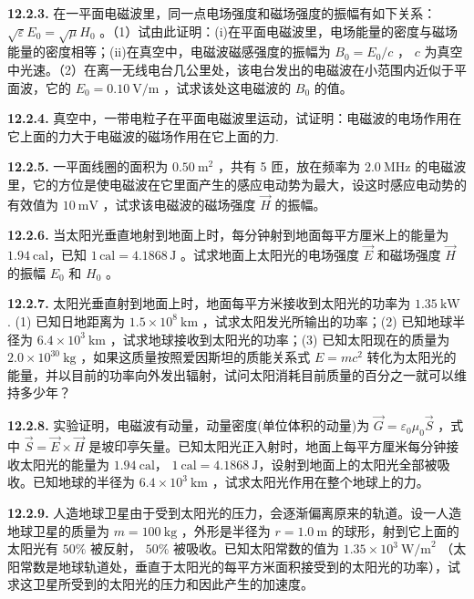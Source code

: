 \vfill
\newpage

\textbf{12.2.3.} 在一平面电磁波里，同一点电场强度和磁场强度的振幅有如下关系： $\sqrt{\varepsilon} E_0 = \sqrt{\mu} H_0$ 。（1）试由此证明：(i)在平面电磁波里，电场能量的密度与磁场能量的密度相等；(ii)在真空中，电磁波磁感强度的振幅为 $B_{0} = E_{0} / c$ ， $c$ 为真空中光速。（2）在离一无线电台几公里处，该电台发出的电磁波在小范围内近似于平面波，它的 $E_0 = 0.10\mathrm{~V/m}$ ，试求该处这电磁波的 $B_{0}$ 的值。

\vfill
\newpage

\textbf{12.2.4.} 真空中，一带电粒子在平面电磁波里运动，试证明：电磁波的电场作用在它上面的力大于电磁波的磁场作用在它上面的力.

\vfill
\newpage

\textbf{12.2.5.} 一平面线圈的面积为 $0.50\mathrm{~m}^{2}$ ，共有 5 匝，放在频率为 $2.0\mathrm{~MHz}$ 的电磁波里，它的方位是使电磁波在它里面产生的感应电动势为最大，设这时感应电动势的有效值为 $10\mathrm{~mV}$ ，试求该电磁波的磁场强度 $\vec{H}$ 的振幅。

\vfill
\newpage

\textbf{12.2.6.} 当太阳光垂直地射到地面上时，每分钟射到地面每平方厘米上的能量为 $1.94\mathrm{~cal}$，已知 $1\,\mathrm{cal} = 4.1868\,\mathrm{J}$ 。试求地面上太阳光的电场强度 $\vec{E}$ 和磁场强度 $\vec{H}$ 的振幅 $E_{0}$ 和 $H_{0}$ 。

\vfill
\newpage

\textbf{12.2.7.} 太阳光垂直射到地面上时，地面每平方米接收到太阳光的功率为 $1.35\mathrm{~kW}$ . (1) 已知日地距离为 $1.5 \times 10^{8}\mathrm{~km}$ ，试求太阳发光所输出的功率；(2) 已知地球半径为 $6.4 \times 10^{3}\mathrm{~km}$ ，试求地球接收到太阳光的功率；(3) 已知太阳现在的质量为 $2.0 \times 10^{30}\mathrm{~kg}$ ，如果这质量按照爱因斯坦的质能关系式 $E = mc^2$ 转化为太阳光的能量，并以目前的功率向外发出辐射，试问太阳消耗目前质量的百分之一就可以维持多少年？

\vfill
\newpage

\textbf{12.2.8.} 实验证明，电磁波有动量，动量密度(单位体积的动量)为 $\vec{G} = \varepsilon_{0}\mu_{0}\vec{S}$ ，式中 $\vec{S} = \vec{E} \times \vec{H}$ 是坡印亭矢量。已知太阳光正入射时，地面上每平方厘米每分钟接收太阳光的能量为 $1.94\mathrm{~cal}$， $1\mathrm{~cal} = 4.1868\mathrm{~J}$，设射到地面上的太阳光全部被吸收。已知地球的半径为 $6.4 \times 10^{3}\mathrm{~km}$ ，试求太阳光作用在整个地球上的力。

\vfill
\newpage

\textbf{12.2.9.} 人造地球卫星由于受到太阳光的压力，会逐渐偏离原来的轨道。设一人造地球卫星的质量为 $m = 100\mathrm{~kg}$ ，外形是半径为 $r = 1.0\mathrm{~m}$ 的球形，射到它上面的太阳光有 $50\%$ 被反射， $50\%$ 被吸收。已知太阳常数的值为 $1.35 \times 10^{3}\mathrm{~W/m}^{2}$ （太阳常数是地球轨道处，垂直于太阳光的每平方米面积接受到的太阳光的功率），试求这卫星所受到的太阳光的压力和因此产生的加速度。

